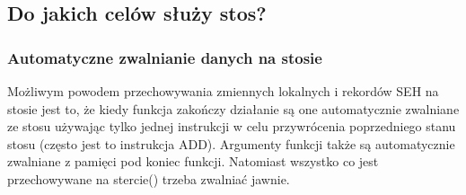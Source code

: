 \subsection{Do jakich celów służy stos?}



\EN{}
\RU{}
\PTBR{}




\subsubsection{Automatyczne zwalnianie danych na stosie}
Możliwym powodem przechowywania zmiennych lokalnych i rekordów SEH na stosie jest to, że kiedy funkcja zakończy działanie są one automatycznie zwalniane ze stosu używając tylko jednej instrukcji w celu przywrócenia poprzedniego stanu stosu (często jest to instrukcja ADD). Argumenty funkcji także są automatycznie zwalniane z pamięci pod koniec funkcji. Natomiast wszystko co jest przechowywane na stercie() trzeba zwalniać jawnie.

\EN{}
\RU{}
\PTBR{}
\PL{}




